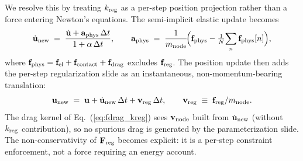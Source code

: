 \documentclass[aps,pre,twocolumn,floatfix,longbibliography]{revtex4-2}
\begin{document}
We resolve this by treating $k_{\rm reg}$ as a per-step position
projection rather than a force entering Newton's equations. The semi-implicit
elastic update becomes
\begin{equation}
  \dot{\mathbf{u}}_{\rm new}
    \;=\; \frac{\dot{\mathbf{u}} + \mathbf{a}_{\rm phys}\,\Delta t}
              {1 + \alpha\,\Delta t},
  \qquad
  \mathbf{a}_{\rm phys}
    \;=\; \frac{1}{m_{\rm node}}
          \!\Big(\mathbf{f}_{\rm phys} - \tfrac{1}{N}\!\sum_n \mathbf{f}_{\rm phys}[n]\Big),
\label{eq:udot_decoupled}
\end{equation}
where $\mathbf{f}_{\rm phys} = \mathbf{f}_{\rm el} + \mathbf{f}_{\rm contact}
+ \mathbf{f}_{\rm drag}$ excludes $\mathbf{f}_{\rm reg}$.
The position update then adds the per-step regularization slide as an
instantaneous, non-momentum-bearing translation:
\begin{equation}
  \mathbf{u}_{\rm new}
    \;=\; \mathbf{u} + \dot{\mathbf{u}}_{\rm new}\,\Delta t
        + \mathbf{v}_{\rm reg}\,\Delta t,
  \qquad
  \mathbf{v}_{\rm reg}
    \;\equiv\; \mathbf{f}_{\rm reg}/m_{\rm node}.
\label{eq:u_decoupled}
\end{equation}
The drag kernel of Eq.~(\ref{eq:fdrag_kreg}) sees $\mathbf{v}_{\rm node}$
built from $\dot{\mathbf{u}}_{\rm new}$ (without $k_{\rm reg}$
contribution), so no spurious drag is generated by the parameterization
slide. The non-conservativity of $\mathbf{F}_{\rm reg}$ becomes explicit:
it is a per-step constraint enforcement, not a force requiring an energy
account.
\end{document}
